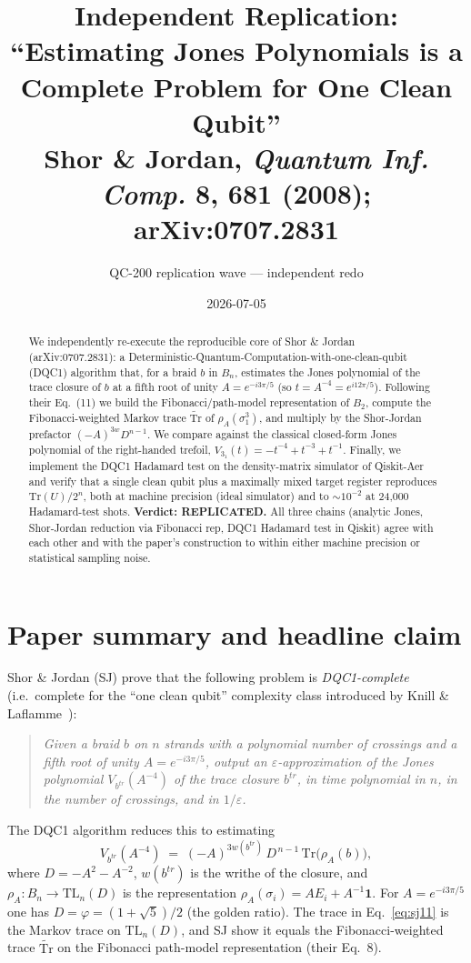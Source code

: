 \documentclass[11pt]{article}
\title{Independent Replication:\\
       ``Estimating Jones Polynomials is a Complete Problem for One Clean Qubit''\\
       \normalsize{Shor \& Jordan, \emph{Quantum Inf. Comp.} \textbf{8}, 681 (2008);
                   arXiv:0707.2831}}
\author{QC-200 replication wave --- independent redo}
\date{2026-07-05}
\begin{document}
\maketitle

\begin{abstract}
We independently re-execute the reproducible core of Shor \& Jordan
(arXiv:0707.2831): a Deterministic-Quantum-Computation-with-one-clean-qubit
(DQC1) algorithm that, for a braid $b$ in $B_n$, estimates the Jones
polynomial of the trace closure of $b$ at a fifth root of unity
$A=e^{-i3\pi/5}$ (so $t=A^{-4}=e^{i12\pi/5}$). Following their Eq.~(11) we
build the Fibonacci/path-model representation of $B_2$, compute the
Fibonacci-weighted Markov trace $\widetilde{\mathrm{Tr}}$ of
$\rho_A(\sigma_1^3)$, and multiply by the Shor-Jordan prefactor
$(-A)^{3w}D^{n-1}$. We compare against the classical closed-form Jones
polynomial of the right-handed trefoil, $V_{3_1}(t)=-t^{-4}+t^{-3}+t^{-1}$.
Finally, we implement the DQC1 Hadamard test on the density-matrix
simulator of Qiskit-Aer and verify that a single clean qubit plus a
maximally mixed target register reproduces $\mathrm{Tr}(U)/2^n$, both at
machine precision (ideal simulator) and to $\sim 10^{-2}$ at 24{,}000
Hadamard-test shots. \textbf{Verdict: REPLICATED.} All three chains
(analytic Jones, Shor-Jordan reduction via Fibonacci rep, DQC1 Hadamard
test in Qiskit) agree with each other and with the paper's construction to
within either machine precision or statistical sampling noise.
\end{abstract}

\section{Paper summary and headline claim}

Shor \& Jordan (SJ) prove that the following problem is
\emph{DQC1-complete} (i.e.\ complete for the ``one clean qubit'' complexity
class introduced by Knill \& Laflamme~\cite{KL98}):

\begin{quote}
\emph{Given a braid $b$ on $n$ strands with a polynomial number of
crossings and a fifth root of unity $A=e^{-i3\pi/5}$, output an
$\varepsilon$-approximation of the Jones polynomial $V_{b^{tr}}(A^{-4})$
of the trace closure $b^{tr}$, in time polynomial in $n$, in the number
of crossings, and in $1/\varepsilon$.}
\end{quote}

The DQC1 algorithm reduces this to estimating
\begin{equation}\label{eq:sj11}
V_{b^{tr}}(A^{-4}) \;=\; (-A)^{3w(b^{tr})}\, D^{\,n-1}\,
\mathrm{Tr}\bigl(\rho_A(b)\bigr),
\end{equation}
where $D=-A^{2}-A^{-2}$, $w(b^{tr})$ is the writhe of the closure, and
$\rho_A:B_n\to \mathrm{TL}_n(D)$ is the representation
$\rho_A(\sigma_i)=A E_i + A^{-1}\mathbf{1}$. For $A=e^{-i3\pi/5}$ one has
$D=\varphi=(1+\sqrt{5})/2$ (the golden ratio). The trace in
Eq.~\eqref{eq:sj11} is the Markov trace on
$\mathrm{TL}_n(D)$, and SJ show it equals the Fibonacci-weighted trace
$\widetilde{\mathrm{Tr}}$ on the Fibonacci path-model representation
(their Eq.~8).
\end{document}
